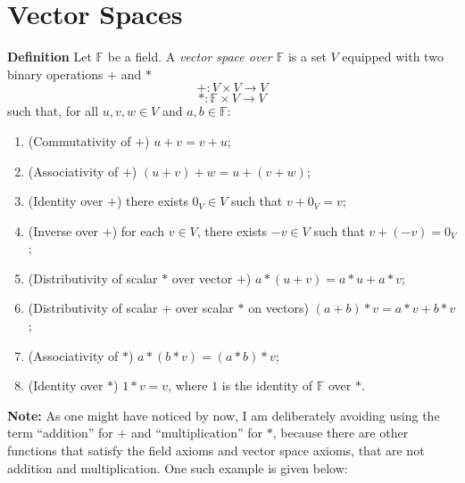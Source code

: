 \documentclass[a4paper,11pt,abstract=true]{scrartcl}
\theoremstyle{dotlessP}
\theoremstyle{dotlessS}
\theoremstyle{remark}
\theoremstyle{definition}
\begin{document}
\section{Vector Spaces}

\textbf{Definition} Let $\mathbb{F}$ be a field. A \emph{vector space over $\mathbb{F}$} is a
set $V$ equipped with two binary operations $+$ and $*$
\[
+:V\times V\longrightarrow V
\]
\[
*:\mathbb{F}\times V\longrightarrow V
\]
such that, for all $u,v,w\in V$ and $a,b\in \mathbb{F}$:
\begin{enumerate}
    \item (Commutativity of $+$) $u+v=v+u$;
    \item (Associativity of $+$) $(u+v)+w=u+(v+w)$;
    \item (Identity over $+$) there exists $0_V\in V$ such that $v+0_V=v$;
    \item (Inverse over $+$) for each $v\in V$, there exists $-v\in V$ such that $v+(-v)=0_V$;
    \item (Distributivity of scalar $*$ over vector $+$) $a*(u+v)=a*u+a*v$;
    \item (Distributivity of scalar $+$ over scalar $*$ on vectors) $(a+b)*v=a*v+b*v$;
    \item (Associativity of $*$) $a*(b*v)=(a*b)*v$;
    \item (Identity over $*$) $1*v=v$, where $1$ is the identity of $\mathbb{F}$ over $*$.
\end{enumerate}

\textbf{Note:} As one might have noticed by now, I am deliberately avoiding using the term ``addition'' for $+$ and ``multiplication'' for $*$, because there are other functions that satisfy the field axioms and vector space axioms, that are not addition and multiplication. One such example is given below:
\end{document}
